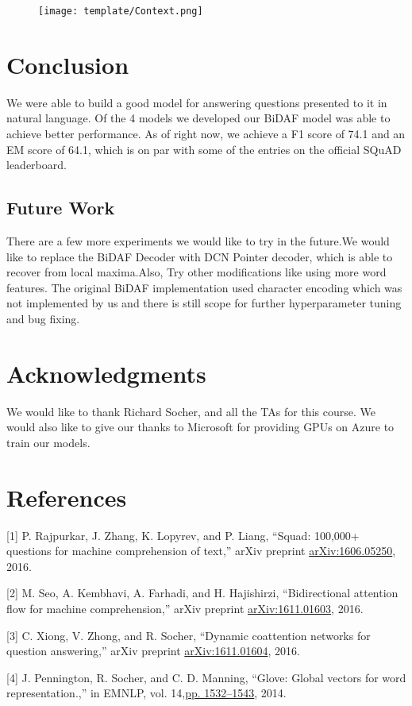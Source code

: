 \documentclass{article} %
\begin{document}
\begin{figure}
\texttt{[image: template/Context.png]}
\centering
\end{figure}

 

\section{Conclusion}

We were able to build a good model for answering questions presented to it in natural language. Of the 4 models we developed our BiDAF model was able to achieve better performance.
As of right now, we achieve a F1 score of 74.1 and an EM score of 64.1, which is on par with some of the entries on the official SQuAD leaderboard.


\subsection*{Future Work}

There are a few more experiments we would like to try in the future.We would like to replace the BiDAF Decoder with DCN Pointer decoder, which is able to recover from local maxima.Also, Try other modifications like using more word features.
The original BiDAF implementation used character encoding which was not implemented by us and there is still scope for further hyperparameter
tuning and bug fixing.

\section{Acknowledgments}

We would like to thank Richard Socher, and all the TAs for this course.
We would also like to give our thanks to Microsoft for providing GPUs on Azure to train our models.

\section*{References}

\small{

[1] P. Rajpurkar, J. Zhang, K. Lopyrev, and P. Liang, “Squad: 100,000+ questions for machine comprehension of text,” arXiv preprint \href{https://arxiv.org/abs/1606.05250}{arXiv:1606.05250}, 2016.

[2] M. Seo, A. Kembhavi, A. Farhadi, and H. Hajishirzi, “Bidirectional attention flow for machine comprehension,” arXiv preprint \href{https://arxiv.org/abs/1611.01603}{arXiv:1611.01603}, 2016.

[3] C. Xiong, V. Zhong, and R. Socher, “Dynamic coattention networks for question answering,” arXiv preprint \href{https://arxiv.org/abs/1611.01604}{arXiv:1611.01604}, 2016.

[4] J. Pennington, R. Socher, and C. D. Manning, “Glove: Global vectors for word representation.,” in EMNLP, vol. 14,\href{https://nlp.stanford.edu/pubs/glove.pdf}{pp. 1532–1543}, 2014.

}
\end{document}

